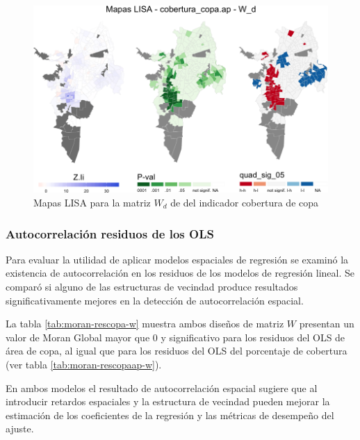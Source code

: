 \documentclass[12pt,a4paper,oneside, openany]{book}
\theoremstyle{definition}
\theoremstyle{definition}
\theoremstyle{definition}
\theoremstyle{remark}
\begin{document}
\begin{figure}[H]

{\centering \includegraphics[width=1\linewidth]{tesis-unigis_files/figure-latex/mapas-lisa-copaap-wd-1} 

}

\caption{Mapas LISA para la matriz $W_d$ de del indicador cobertura de copa}\label{fig:mapas-lisa-copaap-wd}
\end{figure}

\subsubsection{Autocorrelación residuos de los
OLS}\label{autocorrelaciuxf3n-residuos-de-los-ols}

Para evaluar la utilidad de aplicar modelos espaciales de regresión se
examinó la existencia de autocorrelación en los residuos de los modelos
de regresión lineal. Se comparó si alguno de las estructuras de vecindad
produce resultados significativamente mejores en la detección de
autocorrelación espacial.

La tabla \ref{tab:moran-rescopa-w} muestra ambos diseños de matriz \(W\)
presentan un valor de Moran Global mayor que 0 y significativo para los
residuos del OLS de área de copa, al igual que para los residuos del OLS
del porcentaje de cobertura (ver tabla \ref{tab:moran-rescopaap-w}).

En ambos modelos el resultado de autocorrelación espacial sugiere que al
introducir retardos espaciales y la estructura de vecindad pueden
mejorar la estimación de los coeficientes de la regresión y las métricas
de desempeño del ajuste.
\end{document}
